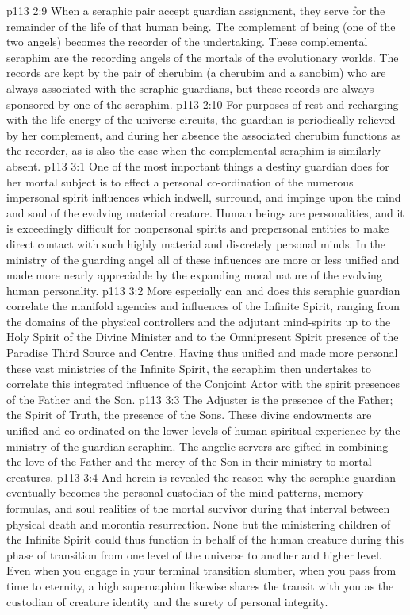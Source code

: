 \vs p113 2:9 When a seraphic pair accept guardian assignment, they serve for the remainder of the life of that human being. The complement of being (one of the two angels) becomes the recorder of the undertaking. These complemental seraphim are the recording angels of the mortals of the evolutionary worlds. The records are kept by the pair of cherubim (a cherubim and a sanobim) who are always associated with the seraphic guardians, but these records are always sponsored by one of the seraphim.
\vs p113 2:10 For purposes of rest and recharging with the life energy of the universe circuits, the guardian is periodically relieved by her complement, and during her absence the associated cherubim functions as the recorder, as is also the case when the complemental seraphim is similarly absent.
\vs p113 3:1 One of the most important things a destiny guardian does for her mortal subject is to effect a personal co\hyp{}ordination of the numerous impersonal spirit influences which indwell, surround, and impinge upon the mind and soul of the evolving material creature. Human beings are personalities, and it is exceedingly difficult for nonpersonal spirits and prepersonal entities to make direct contact with such highly material and discretely personal minds. In the ministry of the guarding angel all of these influences are more or less unified and made more nearly appreciable by the expanding moral nature of the evolving human personality.
\vs p113 3:2 More especially can and does this seraphic guardian correlate the manifold agencies and influences of the Infinite Spirit, ranging from the domains of the physical controllers and the adjutant mind\hyp{}spirits up to the Holy Spirit of the Divine Minister and to the Omnipresent Spirit presence of the Paradise Third Source and Centre. Having thus unified and made more personal these vast ministries of the Infinite Spirit, the seraphim then undertakes to correlate this integrated influence of the Conjoint Actor with the spirit presences of the Father and the Son.
\vs p113 3:3 The Adjuster is the presence of the Father; the Spirit of Truth, the presence of the Sons. These divine endowments are unified and co\hyp{}ordinated on the lower levels of human spiritual experience by the ministry of the guardian seraphim. The angelic servers are gifted in combining the love of the Father and the mercy of the Son in their ministry to mortal creatures.
\vs p113 3:4 And herein is revealed the reason why the seraphic guardian eventually becomes the personal custodian of the mind patterns, memory formulas, and soul realities of the mortal survivor during that interval between physical death and morontia resurrection. None but the ministering children of the Infinite Spirit could thus function in behalf of the human creature during this phase of transition from one level of the universe to another and higher level. Even when you engage in your terminal transition slumber, when you pass from time to eternity, a high supernaphim likewise shares the transit with you as the custodian of creature identity and the surety of personal integrity.
